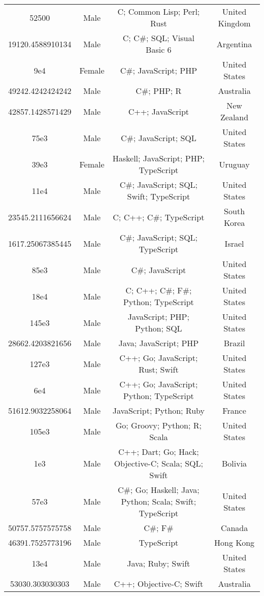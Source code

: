 \begin{center}
\begin{tabular}{ |c|c|c|c| }
52500  &  Male  &  C; Common Lisp; Perl; Rust  &  United Kingdom  \\ 
19120.4588910134  &  Male  &  C; C\#; SQL; Visual Basic 6  &  Argentina  \\ 
9e4  &  Female  &  C\#; JavaScript; PHP  &  United States  \\ 
49242.4242424242  &  Male  &  C\#; PHP; R  &  Australia  \\ 
42857.1428571429  &  Male  &  C++; JavaScript  &  New Zealand  \\ 
75e3  &  Male  &  C\#; JavaScript; SQL  &  United States  \\ 
39e3  &  Female  &  Haskell; JavaScript; PHP; TypeScript  &  Uruguay  \\ 
11e4  &  Male  &  C\#; JavaScript; SQL; Swift; TypeScript  &  United States  \\ 
23545.2111656624  &  Male  &  C; C++; C\#; TypeScript  &  South Korea  \\ 
1617.25067385445  &  Male  &  C\#; JavaScript; SQL; TypeScript  &  Israel  \\ 
85e3  &  Male  &  C\#; JavaScript  &  United States  \\ 
18e4  &  Male  &  C; C++; C\#; F\#; Python; TypeScript  &  United States  \\ 
145e3  &  Male  &  JavaScript; PHP; Python; SQL  &  United States  \\ 
28662.4203821656  &  Male  &  Java; JavaScript; PHP  &  Brazil  \\ 
127e3  &  Male  &  C++; Go; JavaScript; Rust; Swift  &  United States  \\ 
6e4  &  Male  &  C++; Go; JavaScript; Python; TypeScript  &  United States  \\ 
51612.9032258064  &  Male  &  JavaScript; Python; Ruby  &  France  \\ 
105e3  &  Male  &  Go; Groovy; Python; R; Scala  &  United States  \\ 
1e3  &  Male  &  C++; Dart; Go; Hack; Objective-C; Scala; SQL; Swift  &  Bolivia  \\ 
57e3  &  Male  &  C\#; Go; Haskell; Java; Python; Scala; Swift; TypeScript  &  United States  \\ 
50757.5757575758  &  Male  &  C\#; F\#  &  Canada  \\ 
46391.7525773196  &  Male  &  TypeScript  &  Hong Kong  \\ 
13e4  &  Male  &  Java; Ruby; Swift  &  United States  \\ 
53030.303030303  &  Male  &  C++; Objective-C; Swift  &  Australia  \\ 

\end{tabular}
\end{center}
